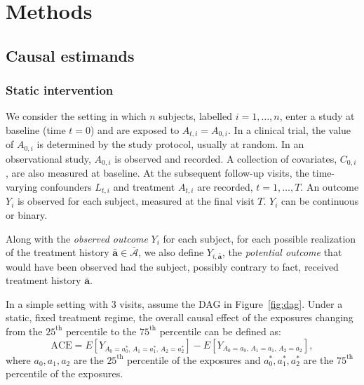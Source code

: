 
\section*{Methods}

\subsection*{Causal estimands}

\subsubsection*{Static intervention}

We consider the setting in which $n$ subjects, labelled $i = 1, \ldots, n$, enter a study at baseline (time $t = 0$) and are exposed to $A_{t,i} = A_{0,i}$. In a clinical trial, the value of $A_{0,i}$ is determined by the study protocol, usually at random. In an observational study, $A_{0,i}$ is observed and recorded. A collection of covariates, $C_{0,i}$, are also measured at baseline. At the subsequent follow-up visits, the time-varying confounders $L_{t,i}$ and treatment $A_{t,i}$ are recorded, $t = 1, \ldots, T$. An outcome $Y_i$ is observed for each subject, measured at the final visit $T$. $Y_i$ can be continuous or binary.

Along with the \emph{observed outcome} $Y_i$ for each subject, for each possible realization of the treatment history $\bar{\mathbf{a}} \in \bar{\mathcal{A}}$, we also define $Y_{i, \bar{\mathbf{a}}}$, the \emph{potential outcome} that would have been observed had the subject, possibly contrary to fact, received treatment history $\bar{\mathbf{a}}$.

In a simple setting with 3 visits, assume the DAG in Figure~\ref{fig:dag}. Under a static, fixed treatment regime, the overall causal effect of the exposures changing from the $25^{\text{th}}$ percentile to the $75^{\text{th}}$ percentile can be defined as:
\begin{equation*}
    \text{ACE} = E\!\left[Y_{A_0 = a_0^*,\, A_1 = a_1^*,\, A_2 = a_2^*}\right] - E\!\left[Y_{A_0 = a_0,\, A_1 = a_1,\, A_2 = a_2}\right],
\end{equation*}
where $a_0, a_1, a_2$ are the $25^{\text{th}}$ percentile of the exposures and $a_0^*, a_1^*, a_2^*$ are the $75^{\text{th}}$ percentile of the exposures.

